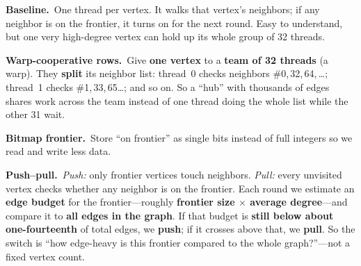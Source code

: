 \documentclass[
    a0paper,
    margin=0.14in,
    innermargin=5mm,
    blockverticalspace=3mm,
    colspace=3mm,
    subcolspace=2mm,
    20pt,
]{tikzposter}
\begin{document}
\begin{columns}
\begin{subcolumns}
{    \noindent\textbf{Baseline.}\ One thread per vertex. It walks that
    vertex's neighbors; if any neighbor is on the frontier, it turns
    on for the next round. Easy to understand, but one very high-degree
    vertex can hold up its whole group of 32 threads.

    \vspace{0.2em}
    \noindent\textbf{Warp-cooperative rows.}\ Give \textbf{one vertex} to a
    \textbf{team of 32 threads} (a warp). They \textbf{split} its
    neighbor list: thread~0 checks neighbors \#0,\,32,\,64,\,\ldots;
    thread~1 checks \#1,\,33,\,65\ldots; and so on. So a ``hub'' with
    thousands of edges shares work across the team instead of one
    thread doing the whole list while the other 31 wait.

    \vspace{0.2em}
    \noindent\textbf{Bitmap frontier.}\ Store ``on frontier'' as single bits
    instead of full integers so we read and write less data.

    \vspace{0.2em}
    \noindent\textbf{Push--pull.}\ \emph{Push:} only frontier vertices touch
    neighbors. \emph{Pull:} every unvisited vertex checks whether any
    neighbor is on the frontier. Each round we estimate an
    \textbf{edge budget} for the frontier---roughly
    \textbf{frontier size $\times$ average degree}---and compare it to
    \textbf{all edges in the graph}. If that budget is
    \textbf{still below about one-fourteenth} of total edges, we
    \textbf{push}; if it crosses above that, we \textbf{pull}. So the
    switch is ``how edge-heavy is this frontier compared to the whole
    graph?''---not a fixed vertex count.
}


\end{subcolumns}
\end{columns}
\end{document}
